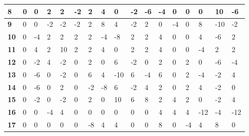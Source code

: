 \begin{longtable}[c]{|l|l|l|l|l|l|l|l|l|l|l|l|l|l|l|l|l|}
\textbf{8}  & 0          & 0          & 2          & 2          & -2         & 2          & 4          & 0          & -2         & -6         & -4          & 0            & 0           & 0           & 10          & -6           \\ \hline
\textbf{9}  & 0          & 0          & -2         & -2         & -2         & 2          & 8          & 4          & -2         & 2          & 0           & -4           & 0           & 8           & -10         & -2           \\ \hline
\textbf{10} & 0          & -4         & 2          & 2          & 2          & 2          & -4         & -8         & 2          & 2          & 4           & 0            & 0           & 4           & -6          & 2            \\ \hline
\textbf{11} & 0          & 4          & 2          & 10         & 2          & 2          & 4          & 0          & 2          & 2          & 4           & 0            & 0           & -4          & 2           & 2            \\ \hline
\textbf{12} & 0          & -2         & 4          & -2         & 0          & 2          & 0          & 6          & -2         & 0          & 2           & 0            & 2           & 0           & -6          & -4           \\ \hline
\textbf{13} & 0          & -6         & 0          & -2         & 0          & 6          & 4          & -10        & 6          & -4         & 6           & 0            & 2           & -4          & -2          & 4            \\ \hline
\textbf{14} & 0          & -6         & 0          & 2          & 0          & -2         & -8         & 6          & -2         & 4          & 2           & 0            & 2           & 4           & -2          & 0            \\ \hline
\textbf{15} & 0          & -2         & 0          & -2         & 0          & 2          & 0          & 10         & 6          & 8          & 2           & 4            & 2           & 0           & -2          & 4            \\ \hline
\textbf{16} & 0          & 0          & -4         & 4          & 0          & 0          & 0          & 0          & 0          & 0          & 4           & 4            & 4           & -12         & -4          & -12 \\ \hline
\textbf{17} & 0          & 0          & 0          & 0          & 0          & -8         & 4          & 4          & 0          & 0          & 8           & 0            & -4          & 4           & 8           & 0            \\ \hline

\end{longtable}
